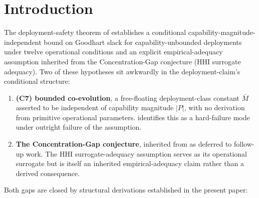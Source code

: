 \section{Introduction}
\label{sec:intro}

The deployment-safety theorem of
\citep[Deployment Safety]{lasser2026paper10} establishes a
conditional capability-magnitude-independent bound on Goodhart
slack for capability-unbounded deployments under twelve
operational conditions and an explicit empirical-adequacy
assumption inherited from the
\citep[Microfoundation]{lasser2026micro} Concentration-Gap
conjecture (HHI surrogate adequacy). Two of these hypotheses sit awkwardly in the
deployment-claim's conditional structure:

\begin{enumerate}
\item \textbf{(C7) bounded co-evolution}, a free-floating
  deployment-class constant $\bar{M}$ asserted to be independent
  of capability magnitude $|P|$, with no derivation from primitive
  operational parameters. \citep[\S 10.2]{lasser2026paper10}
  identifies this as a hard-failure mode under outright failure of
  the assumption.
\item \textbf{The Concentration-Gap conjecture}, inherited from
  \citep{lasser2026micro} as deferred to follow-up work. The HHI
  surrogate-adequacy assumption serves as its operational surrogate
  but is itself an inherited empirical-adequacy claim rather than a
  derived consequence.
\end{enumerate}

Both gaps are closed by structural derivations established in the
present paper:

